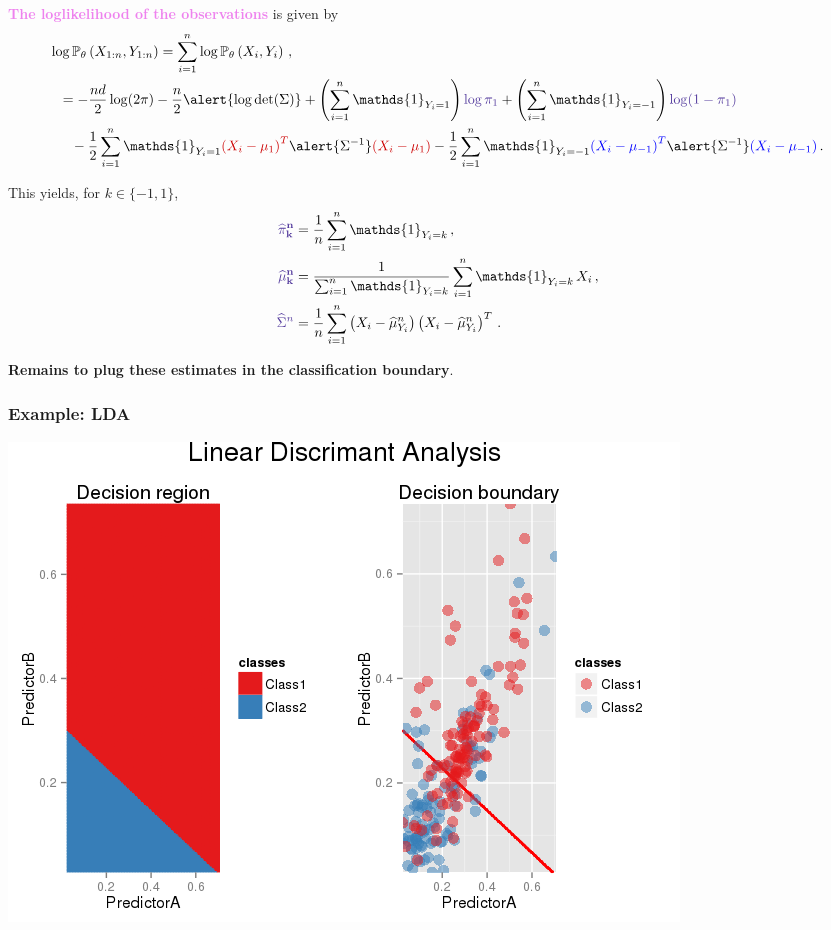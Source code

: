 \documentclass[9pt]{beamer}
\newcommand{\eqsp}{\,}
\begin{document}
\begin{frame}
\textcolor{violet}{{\bf The loglikelihood of the observations}} is given by
\begin{align*}
\log \mathbb{P}_{\theta}\left(X_{1:n},Y_{1:n}\right) &=\sum_{i=1}^n \log \mathbb{P}_{\theta} \left(X_{i},Y_{i}\right)\eqsp,\\
&\hspace{-2.51cm}= - \frac{nd}{2} \log(2\pi)-\frac{n}2 \alert{\log\mathrm{\det}(\Sigma)} + \left(\sum_{i=1}^n\mathds{1}_{Y_i=1}\right)\textcolor{violet}{\log \pi_1} + \left(\sum_{i=1}^n\mathds{1}_{Y_i=-1}\right)\textcolor{violet}{\log (1-\pi_{1})}\\
& \hspace{-2.21cm}-  \frac{1}{2}\sum_{i=1}^n\mathds{1}_{Y_i=1}\textcolor{lightr}{\left(X_i - \mu_{1}\right)^T}\alert{\Sigma^{-1}}\textcolor{lightr}{\left(X_i - \mu_{1}\right)} -  \frac{1}{2}\sum_{i=1}^n\mathds{1}_{Y_i=-1}\textcolor{blue}{\left(X_i - \mu_{-1}\right)^T}\alert{\Sigma^{-1}}\textcolor{blue}{\left(X_i - \mu_{-1}\right)}\eqsp.
\end{align*}

\vspace{.3cm}

This yields, for $k\in\{-1,1\}$,  
\begin{align*}
\textcolor{violet}{{\bf \widehat \pi_k^n}} &= \frac{1}{n}\sum_{i=1}^n\mathds{1}_{Y_i=k}\,,\\
\textcolor{violet}{{\bf \widehat \mu_k^n}} &= \frac{1}{\sum_{i=1}^n\mathds{1}_{Y_i=k}}\sum_{i=1}^n\mathds{1}_{Y_i=k}\,X_i\,,\\
\textcolor{violet}{\widehat\Sigma^n} &= \frac{1}{n}\sum_{i=1}^n \left(X_i - \widehat \mu_{Y_i}^n\right)\left(X_i - \widehat \mu_{Y_i}^n\right)^T\eqsp.
\end{align*}

\textcolor{lightr}{{\bf Remains to plug these estimates in the classification boundary}}.
\end{frame}

\begin{frame}
\frametitle{Example: LDA }
\begin{center}
\hspace*{-.05\textwidth}\includegraphics[height=.65\textheight]{LDA_and_QDA-1}
\end{center}
\end{frame}
\end{document}
